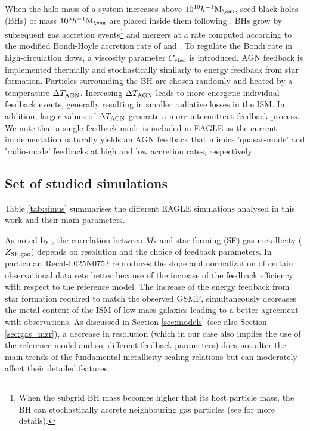 \documentclass[useAMS,usenatbib]{mn2e}
\begin{document}
When the halo mass of a system increases above $10^{10} h^{-1} {\rm M}_{\sun}$, 
seed black holes (BHs) of mass $10^5 h^{-1} {\rm M}_{\sun}$ are placed inside them 
following \citet{springel2005b}.  
BHs grow by subsequent gas accretion events\footnote{ 
When the subgrid BH mass becomes higher that its host
particle mass, the BH can stochastically accrete neighbouring
gas particles (see \citealt{schaye2015} for more details).}
and mergers
at a rate computed according to the modified Bondi-Hoyle accretion rate of 
\citet{rosasguevara2015} and \citet{schaye2015}.  
To regulate the Bondi rate in high-circulation flows,
a viscosity parameter $C_{\rm visc}$ is introduced.  
AGN feedback is implemented thermally and stochastically similarly to energy feedback from star formation.
Particles surrounding the BH are chosen randomly and heated by a temperature 
$\Delta T_{\rm AGN}$.
Increasing $\Delta T_{\rm AGN}$ leads to more energetic individual feedback
events, generally resulting in smaller radiative
losses in the ISM. In addition, larger values of $\Delta T_{\rm AGN}$ generate a 
more intermittent feedback process.
We note that a single feedback mode is included in {\sc EAGLE} as 
the current implementation naturally yields an AGN feedback that mimics 'quasar-mode' and 'radio-mode'
feedbacks at high and low accretion rates, respectively \citep{rosasguevara2016}.


\subsection{Set of studied simulations}
\label{sec:simulation_set}

Table \ref{tab:simus} summarises the different {\sc EAGLE} simulations analysed in this work and their main
parameters.

As noted by \citet{schaye2015}, the correlation between $M_*$ and star forming (SF)
gas metallicity ($Z_{\rm SF,gas}$) depends on resolution and the choice of feedback parameters.  
In particular, Recal-L025N0752 reproduces the 
slope and normalization of certain observational data sets 
better because of the increase of the feedback efficiency with respect to 
the reference model.
The increase of the energy feedback from star formation required to match the observed 
GSMF, simultaneously decreases the metal content of the ISM of low-mass galaxies
leading to a better agreement with observations.
As discussed in Section \ref{sec:models} (see also Section \ref{sec:gas_mzr}), a decrease in resolution (which in our case also implies the use of
the reference model and so, different feedback parameters) does not alter
the main trends of the fundamental metallicity scaling relations but can moderately
affect their detailed features.
\end{document}
